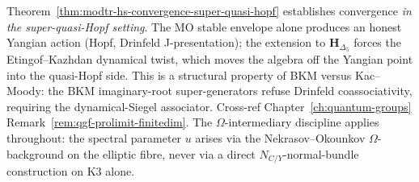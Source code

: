 \begin{remark}
\label{rem:modtr-scope-super-quasi-hopf}
Theorem~\ref{thm:modtr-hs-convergence-super-quasi-hopf}
establishes convergence \emph{in the super-quasi-Hopf setting}. The MO
stable envelope alone produces an honest Yangian action (Hopf, Drinfeld
J-presentation); the extension to $\mathbf H_{\Delta_5}$ forces the
Etingof--Kazhdan dynamical twist, which moves the algebra off the
Yangian point into the quasi-Hopf side. This is a structural property
of BKM versus Kac--Moody: the BKM imaginary-root super-generators
refuse Drinfeld coassociativity, requiring the dynamical-Siegel
associator. Cross-ref Chapter~\ref{ch:quantum-groups}
Remark~\ref{rem:qgf-prolimit-finitedim}. The
$\Omega$-intermediary discipline applies throughout: the
spectral parameter $u$ arises via the Nekrasov--Okounkov
$\Omega$-background on the elliptic fibre, never via a direct
$N_{C/Y}$-normal-bundle construction on $\mathrm K3$ alone.
\end{remark}

